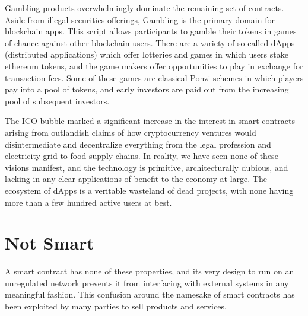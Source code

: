 
Gambling products overwhelmingly dominate the remaining set of contracts. Aside
from illegal securities offerings, Gambling is the primary domain for blockchain
apps. This script allows participants to gamble their tokens in games of chance
against other blockchain users. There are a variety of so-called dApps
(distributed applications) which offer lotteries and games in which users stake
ethereum tokens, and the game makers offer opportunities to play in exchange for
transaction fees. Some of these games are classical Ponzi schemes in which
players pay into a pool of tokens, and early investors are paid out from the
increasing pool of subsequent investors. \cite{pinna_massive_2019, hartel_empirical_2019}

The ICO bubble marked a significant increase in the interest in smart contracts
arising from outlandish claims of how cryptocurrency ventures would
disintermediate and decentralize everything from the legal profession and
electricity grid to food supply chains. In reality, we have seen none of these
visions manifest, and the technology is primitive, architecturally dubious, and
lacking in any clear applications of benefit to the economy at large. The
ecosystem of dApps is a veritable wasteland of dead projects, with none having
more than a few hundred active users at best.

\section{Not Smart}

A smart contract has none of these properties, and its very design to run on an
unregulated network prevents it from interfacing with external systems in any
meaningful fashion. This confusion around the namesake of smart contracts has
been exploited by many parties to sell products and services.

